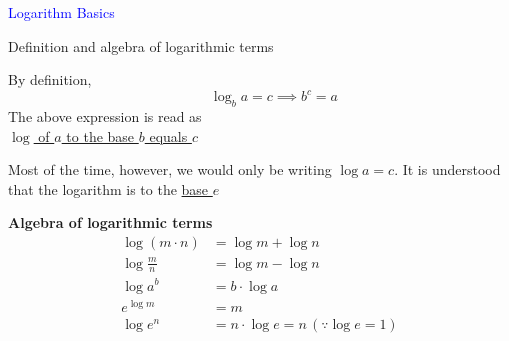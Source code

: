 \documentclass[14pt,fleqn]{extarticle}
\begin{document}
\begin{skill}
\textcolor{blue}{Logarithm Basics}

Definition and algebra of logarithmic terms 
\end{skill}

\newcard 

By definition, \[ \qquad \log_b a = c \implies b^c = a \]
The above expression is read as \\
\underline{$\log$ of $a$ to the base $b$ equals $c$}\newline 

Most of the time, however, we would
only be writing $\log a = c$. It is understood that the logarithm 
is to the \underline{base $e$}\newline 

\textbf{Algebra of logarithmic terms}
\begin{align}
\log (m\cdot n) &= \log m + \log n \\
\log \frac{m}{n} &= \log m - \log n \\ 
\log a^b &= b\cdot \log a \\ 
e^{\log m} &= m \\
\log e^{n} &= n\cdot\log e = n\,(\because \log e = 1)
\end{align}
\end{document}
